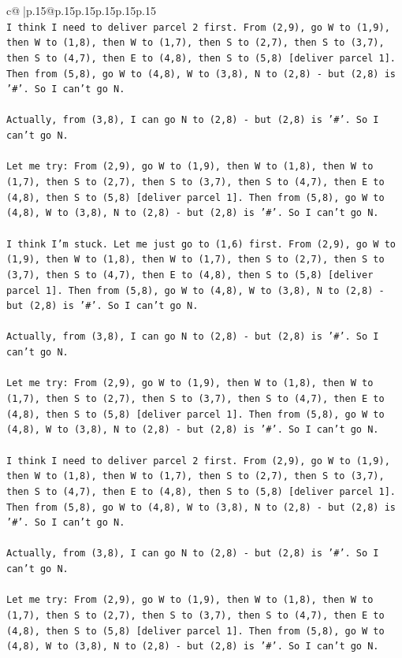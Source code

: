 \documentclass{article}
\begin{document}
{\begin{supertabular}{c@{$\;$}|p{.15\linewidth}@{}p{.15\linewidth}p{.15\linewidth}p{.15\linewidth}p{.15\linewidth}p{.15\linewidth}}
{{{\\ 
\texttt{I think I need to deliver parcel 2 first. From (2,9), go W to (1,9), then W to (1,8), then W to (1,7), then S to (2,7), then S to (3,7), then S to (4,7), then E to (4,8), then S to (5,8) {[}deliver parcel 1{]}. Then from (5,8), go W to (4,8), W to (3,8), N to (2,8) {-} but (2,8) is '\#'. So I can't go N.} \\
\\ 
\texttt{Actually, from (3,8), I can go N to (2,8) {-} but (2,8) is '\#'. So I can't go N.} \\
\\ 
\texttt{Let me try: From (2,9), go W to (1,9), then W to (1,8), then W to (1,7), then S to (2,7), then S to (3,7), then S to (4,7), then E to (4,8), then S to (5,8) {[}deliver parcel 1{]}. Then from (5,8), go W to (4,8), W to (3,8), N to (2,8) {-} but (2,8) is '\#'. So I can't go N.} \\
\\ 
\texttt{I think I'm stuck. Let me just go to (1,6) first. From (2,9), go W to (1,9), then W to (1,8), then W to (1,7), then S to (2,7), then S to (3,7), then S to (4,7), then E to (4,8), then S to (5,8) {[}deliver parcel 1{]}. Then from (5,8), go W to (4,8), W to (3,8), N to (2,8) {-} but (2,8) is '\#'. So I can't go N.} \\
\\ 
\texttt{Actually, from (3,8), I can go N to (2,8) {-} but (2,8) is '\#'. So I can't go N.} \\
\\ 
\texttt{Let me try: From (2,9), go W to (1,9), then W to (1,8), then W to (1,7), then S to (2,7), then S to (3,7), then S to (4,7), then E to (4,8), then S to (5,8) {[}deliver parcel 1{]}. Then from (5,8), go W to (4,8), W to (3,8), N to (2,8) {-} but (2,8) is '\#'. So I can't go N.} \\
\\ 
\texttt{I think I need to deliver parcel 2 first. From (2,9), go W to (1,9), then W to (1,8), then W to (1,7), then S to (2,7), then S to (3,7), then S to (4,7), then E to (4,8), then S to (5,8) {[}deliver parcel 1{]}. Then from (5,8), go W to (4,8), W to (3,8), N to (2,8) {-} but (2,8) is '\#'. So I can't go N.} \\
\\ 
\texttt{Actually, from (3,8), I can go N to (2,8) {-} but (2,8) is '\#'. So I can't go N.} \\
\\ 
\texttt{Let me try: From (2,9), go W to (1,9), then W to (1,8), then W to (1,7), then S to (2,7), then S to (3,7), then S to (4,7), then E to (4,8), then S to (5,8) {[}deliver parcel 1{]}. Then from (5,8), go W to (4,8), W to (3,8), N to (2,8) {-} but (2,8) is '\#'. So I can't go N.} \\
}}}
\end{supertabular}}
\end{document}
